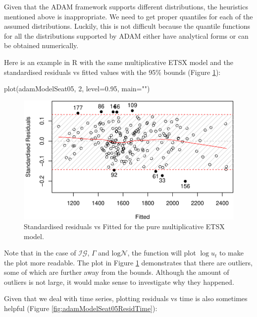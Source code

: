 \documentclass[
]{book}
\newenvironment{Shaded}{\begin{snugshade}}{\end{snugshade}}
\newcommand{\AttributeTok}[1]{\textcolor[rgb]{0.77,0.63,0.00}{#1}}
\newcommand{\DecValTok}[1]{\textcolor[rgb]{0.00,0.00,0.81}{#1}}
\newcommand{\FloatTok}[1]{\textcolor[rgb]{0.00,0.00,0.81}{#1}}
\newcommand{\FunctionTok}[1]{\textcolor[rgb]{0.00,0.00,0.00}{#1}}
\newcommand{\NormalTok}[1]{#1}
\newcommand{\StringTok}[1]{\textcolor[rgb]{0.31,0.60,0.02}{#1}}
\theoremstyle{definition}
\theoremstyle{definition}
\theoremstyle{definition}
\theoremstyle{definition}
\theoremstyle{remark}
\begin{document}
Given that the ADAM framework supports different distributions, the heuristics mentioned above is inappropriate. We need to get proper quantiles for each of the assumed distributions. Luckily, this is not difficult because the quantile functions for all the distributions supported by ADAM either have analytical forms or can be obtained numerically.

Here is an example in R with the same multiplicative ETSX model and the standardised residuals vs fitted values with the 95\% bounds (Figure \ref{fig:adamModelSeat05ResidFitted}):

\begin{Shaded}
\begin{Highlighting}[]
\FunctionTok{plot}\NormalTok{(adamModelSeat05, }\DecValTok{2}\NormalTok{, }\AttributeTok{level=}\FloatTok{0.95}\NormalTok{, }\AttributeTok{main=}\StringTok{""}\NormalTok{)}
\end{Highlighting}
\end{Shaded}

\begin{figure}
\centering
\includegraphics{Svetunkov--2022----ADAM_files/figure-latex/adamModelSeat05ResidFitted-1.pdf}
\caption{\label{fig:adamModelSeat05ResidFitted}Standardised residuals vs Fitted for the pure multiplicative ETSX model.}
\end{figure}

Note that in the case of \(\mathcal{IG}\), \(\Gamma\) and \(\mathrm{log}\mathcal{N}\), the function will plot \(\log u_t\) to make the plot more readable. The plot in Figure \ref{fig:adamModelSeat05ResidFitted} demonstrates that there are outliers, some of which are further away from the bounds. Although the amount of outliers is not large, it would make sense to investigate why they happened.

Given that we deal with time series, plotting residuals vs time is also sometimes helpful (Figure \ref{fig:adamModelSeat05ResidTime}):
\end{document}
